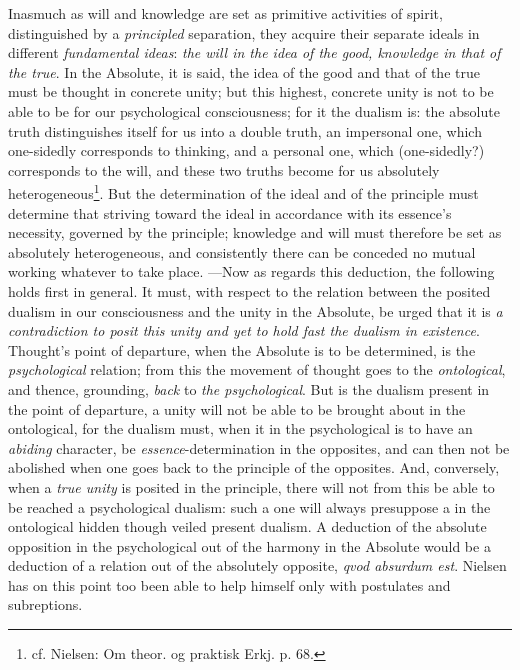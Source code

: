 \documentclass[12pt,a4paper]{book}
\begin{document}
Inasmuch as will and knowledge are set as primitive activities of spirit, distinguished by a
\emph{principled} separation, they acquire their separate ideals in different \emph{fundamental
ideas}: \emph{the will in the idea of the good, knowledge in that of the true}. In the Absolute,
it is said, the idea of the good and that of the true must be thought in concrete unity; but this
highest, concrete unity is not to be able to be for our psychological consciousness; for it the
dualism is: the absolute truth distinguishes itself for us into a double truth, an impersonal one,
which one-sidedly corresponds to thinking, and a personal one, which (one-sidedly?) corresponds to
the will, and these two truths become for us absolutely heterogeneous\footnote{cf. Nielsen: Om
theor. og praktisk Erkj. p. 68.}. But the determination of the ideal and of the principle must
determine that striving toward the ideal in accordance with its essence's necessity, governed by
the principle; knowledge and will must therefore be set as absolutely heterogeneous, and
consistently there can be conceded no mutual working whatever to take place. ---Now as regards this
deduction, the following holds first in general. It must, with respect to the relation between the
posited dualism in our consciousness and the unity in the Absolute, be urged that it is \emph{a
contradiction to posit this unity and yet to hold fast the dualism in existence}. Thought's point
of departure, when the Absolute is to be determined, is the \emph{psychological} relation; from this the
movement of thought goes to the \emph{ontological}, and thence, grounding, \emph{back} to \emph{the psychological}. But
is the dualism present in the point of departure, a unity will not be able to be brought about in
the ontological, for the dualism must, when it in the psychological is to have an \emph{abiding}
character, be \emph{essence}-determination in the opposites, and can then not be abolished when one
goes back to the principle of the opposites. And, conversely, when a \emph{true unity} is posited in
the principle, there will not from this be able to be reached a psychological dualism: such a one
will always presuppose a in the ontological hidden though veiled present dualism. A deduction of the
absolute opposition in the psychological out of the harmony in the Absolute would be a deduction of
a relation out of the absolutely opposite, \textit{qvod absurdum est}. Nielsen has on this point too
been able to help himself only with postulates and subreptions.
\end{document}
